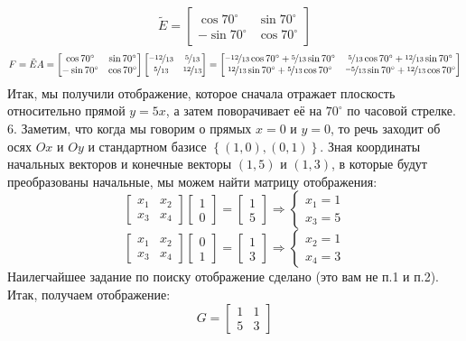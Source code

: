 \documentclass[a3paper,14pt]{extarticle}
\begin{document}
$$\tilde{E} = \begin{bmatrix}
    \cos70^\circ & \sin70^\circ \\ -\sin70^\circ & \cos70^\circ
\end{bmatrix}$$
$$F = \tilde{E}A = \begin{bmatrix}
    \cos70^\circ & \sin70^\circ \\ -\sin70^\circ & \cos70^\circ
\end{bmatrix}\begin{bmatrix}
    \nicefrac{-12}{13} & \nicefrac{5}{13} \\ \nicefrac{5}{13} & \nicefrac{12}{13}
\end{bmatrix} = \begin{bmatrix}
    \nicefrac{-12}{13}\cos70^\circ + \nicefrac{5}{13}\sin70^\circ &
    \nicefrac{5}{13}\cos70^\circ + \nicefrac{12}{13}\sin70^\circ \\
    \nicefrac{12}{13}\sin70^\circ + \nicefrac{5}{13}\cos70^\circ &
    \nicefrac{-5}{13}\sin70^\circ + \nicefrac{12}{13}\cos70^\circ
\end{bmatrix}$$
Итак, мы получили отображение, которое сначала отражает плоскость относительно прямой $y = 5x$, а затем поворачивает её на $70^\circ$ по часовой стрелке.\\[1.5em]
6. Заметим, что когда мы говорим о прямых $x=0$ и $y = 0$, то речь заходит об осях $Ox$ и $Oy$ и стандартном базисе $\left\{(1, 0), (0, 1)\right\}$. Зная координаты начальных векторов и конечные векторы $(1, 5)$ и $(1, 3)$, в которые будут преобразованы начальные, мы можем найти матрицу отображения:
$$\begin{bmatrix}
    x_1 & x_2 \\ x_3 & x_4
\end{bmatrix}\begin{bmatrix}
    1 \\ 0
\end{bmatrix} = \begin{bmatrix}
    1 \\ 5
\end{bmatrix} \Rightarrow \begin{cases}
    x_1 = 1 \\ x_3 = 5
\end{cases}$$
$$\begin{bmatrix}
    x_1 & x_2 \\ x_3 & x_4
\end{bmatrix}\begin{bmatrix}
    0 \\ 1
\end{bmatrix} = \begin{bmatrix}
    1 \\ 3
\end{bmatrix} \Rightarrow \begin{cases}
    x_2 = 1 \\ x_4 = 3
\end{cases}$$
Наилегчайшее задание по поиску отображение сделано (это вам не п.1 и п.2). Итак, получаем отображение:
$$G = \begin{bmatrix}
    1 & 1 \\ 5 & 3
\end{bmatrix}$$\pagebreak
\end{document}
